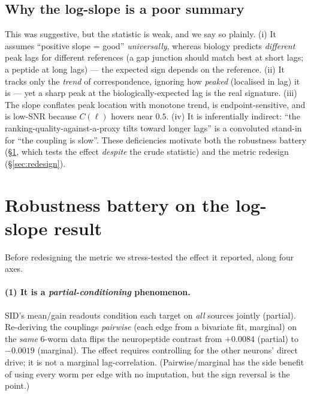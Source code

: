 \documentclass[11pt]{article}
\begin{document}
\subsection{Why the log-slope is a poor summary}
\label{sec:critique}
This was suggestive, but the statistic is weak, and we say so plainly. (i) It assumes ``positive slope
= good'' \emph{universally}, whereas biology predicts \emph{different} peak lags for different
references (a gap junction should match best at short lags; a peptide at long lags) --- the expected
sign depends on the reference. (ii) It tracks only the \emph{trend} of correspondence, ignoring how
\emph{peaked} (localised in lag) it is --- yet a sharp peak at the biologically-expected lag is the
real signature. (iii) The slope conflates peak location with monotone trend, is endpoint-sensitive,
and is low-SNR because $C(\ell)$ hovers near $0.5$. (iv) It is inferentially indirect: ``the
ranking-quality-against-a-proxy tilts toward longer lags'' is a convoluted stand-in for ``the coupling
is slow''. These deficiencies motivate both the robustness battery (\S\ref{sec:robust}, which tests
the effect \emph{despite} the crude statistic) and the metric redesign (\S\ref{sec:redesign}).

\section{Robustness battery on the log-slope result}
\label{sec:robust}

Before redesigning the metric we stress-tested the effect it reported, along four axes.

\paragraph{(1) It is a \emph{partial-conditioning} phenomenon.} SID's mean/gain readouts condition
each target on \emph{all} sources jointly (partial). Re-deriving the couplings \emph{pairwise}
(each edge from a bivariate fit, marginal) on the \emph{same} 6-worm data flips the neuropeptide
contrast from $+0.0084$ (partial) to $-0.0019$ (marginal). The effect requires controlling for the
other neurons' direct drive; it is not a marginal lag-correlation. (Pairwise/marginal has the side
benefit of using every worm per edge with no imputation, but the sign reversal is the point.)
\end{document}
